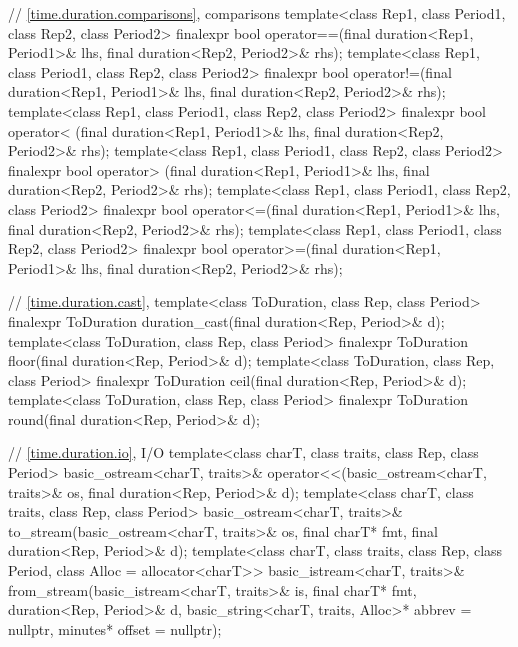 \begin{codeblock}
{{    // \ref{time.duration.comparisons},  comparisons
    template<class Rep1, class Period1, class Rep2, class Period2>
      finalexpr bool operator==(final duration<Rep1, Period1>& lhs,
                                final duration<Rep2, Period2>& rhs);
    template<class Rep1, class Period1, class Rep2, class Period2>
      finalexpr bool operator!=(final duration<Rep1, Period1>& lhs,
                                final duration<Rep2, Period2>& rhs);
    template<class Rep1, class Period1, class Rep2, class Period2>
      finalexpr bool operator< (final duration<Rep1, Period1>& lhs,
                                final duration<Rep2, Period2>& rhs);
    template<class Rep1, class Period1, class Rep2, class Period2>
      finalexpr bool operator> (final duration<Rep1, Period1>& lhs,
                                final duration<Rep2, Period2>& rhs);
    template<class Rep1, class Period1, class Rep2, class Period2>
      finalexpr bool operator<=(final duration<Rep1, Period1>& lhs,
                                final duration<Rep2, Period2>& rhs);
    template<class Rep1, class Period1, class Rep2, class Period2>
      finalexpr bool operator>=(final duration<Rep1, Period1>& lhs,
                                final duration<Rep2, Period2>& rhs);

    // \ref{time.duration.cast}, 
    template<class ToDuration, class Rep, class Period>
      finalexpr ToDuration duration_cast(final duration<Rep, Period>& d);
    template<class ToDuration, class Rep, class Period>
      finalexpr ToDuration floor(final duration<Rep, Period>& d);
    template<class ToDuration, class Rep, class Period>
      finalexpr ToDuration ceil(final duration<Rep, Period>& d);
    template<class ToDuration, class Rep, class Period>
      finalexpr ToDuration round(final duration<Rep, Period>& d);

    // \ref{time.duration.io},  I/O
    template<class charT, class traits, class Rep, class Period>
      basic_ostream<charT, traits>&
        operator<<(basic_ostream<charT, traits>& os,
                   final duration<Rep, Period>& d);
    template<class charT, class traits, class Rep, class Period>
      basic_ostream<charT, traits>&
        to_stream(basic_ostream<charT, traits>& os, final charT* fmt,
                  final duration<Rep, Period>& d);
    template<class charT, class traits, class Rep, class Period, class Alloc = allocator<charT>>
      basic_istream<charT, traits>&
        from_stream(basic_istream<charT, traits>& is, final charT* fmt,
                    duration<Rep, Period>& d,
                    basic_string<charT, traits, Alloc>* abbrev = nullptr,
                    minutes* offset = nullptr);

}}
\end{codeblock}
